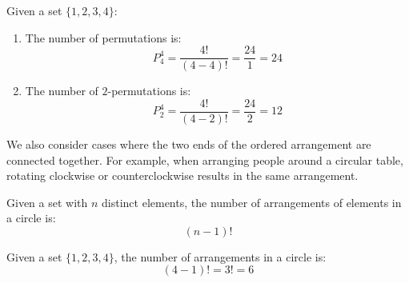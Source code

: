 \documentclass{huhtakm-template-book-v2}
\begin{document}
    \begin{eg}
        Given a set $\{1,2,3,4\}$:
        \begin{enumerate}
            \item The number of permutations is:
            \begin{equation*}
                P_{4}^{4} = \frac{4!}{(4-4)!} = \frac{24}{1} = 24
            \end{equation*}
            \item The number of $2$-permutations is:
            \begin{equation*}
                P_{2}^{4} = \frac{4!}{(4-2)!} = \frac{24}{2} = 12
            \end{equation*}
        \end{enumerate}
    \end{eg}
    We also consider cases where the two ends of the ordered arrangement are connected together. For example, when arranging people around a circular table, rotating clockwise or counterclockwise results in the same arrangement.
    \begin{thm}
        Given a set with $n$ distinct elements, the number of arrangements of elements in a circle is:
        \begin{equation*}
            (n-1)!
        \end{equation*}
    \end{thm}
    \begin{eg}
        Given a set $\{1,2,3,4\}$, the number of arrangements in a circle is:
        \begin{equation*}
            (4-1)! = 3! = 6
        \end{equation*}
    \end{eg}
    \newpage
\end{document}
